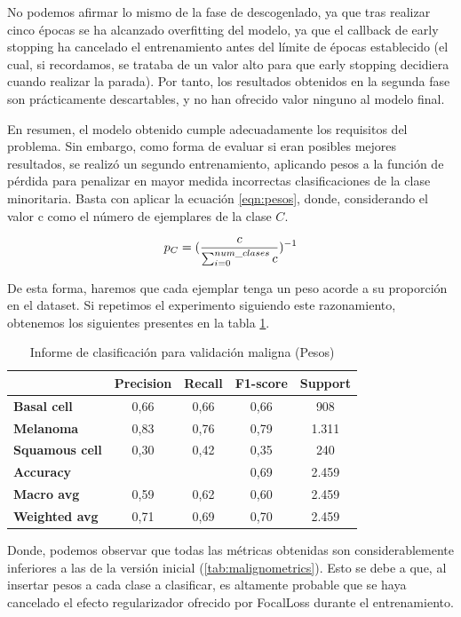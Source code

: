 No podemos afirmar lo mismo de la fase de descogenlado, ya que tras realizar cinco épocas se ha alcanzado overfitting del modelo, ya que el callback de early stopping ha cancelado el entrenamiento antes del límite de épocas establecido (el cual, si recordamos, se trataba de un valor alto para que early stopping decidiera cuando realizar la parada). Por tanto, los resultados obtenidos en la segunda fase son prácticamente descartables, y no han ofrecido valor ninguno al modelo final.

En resumen, el modelo obtenido cumple adecuadamente los requisitos del problema. Sin embargo, como forma de evaluar si eran posibles mejores resultados, se realizó un segundo entrenamiento, aplicando pesos a la función de pérdida para penalizar en mayor medida incorrectas clasificaciones de la clase minoritaria. Basta con aplicar la ecuación \ref{eqn:pesos}, donde, considerando el valor c como el número de ejemplares de la clase $C$.

\begin{equation}
	\label{eqn:pesos}
	\centering
	p_C =(\frac{c}{\sum_{i=0}^{num\_clases} c} )^{-1}
\end{equation}


De esta forma, haremos que cada ejemplar tenga un peso acorde a su proporción en el dataset. Si repetimos el experimento siguiendo este razonamiento, obtenemos los siguientes presentes en la tabla \ref{tab:malignometrics2}.

\begin{table}[!ht]
	\centering
	\begin{tabular}{|l|c|c|c|c|}
		\hline
		& \textbf{Precision} & \textbf{Recall} & \textbf{F1-score} & \textbf{Support} \\
		\hline
		\textbf{Basal cell} & 0,66 & 0,66 & 0,66 & 908 \\
		\textbf{Melanoma} & 0,83 & 0,76 & 0,79 & 1.311 \\
	\textbf{	Squamous cell} & 0,30 & 0,42 & 0,35 & 240 \\
		\hline
		\textbf{Accuracy} &  &  & 0,69 & 2.459 \\ \hline
		\textbf{Macro avg} & 0,59& 0,62& 0,60&2.459\\
		\textbf{Weighted avg}&0,71&0,69&0,70&2.459\\
		\hline
	\end{tabular}
	\caption{Informe de clasificación para validación maligna (Pesos)}
	\label{tab:malignometrics2}
\end{table}


Donde, podemos observar que todas las métricas obtenidas son considerablemente inferiores a las de la versión inicial (\ref{tab:malignometrics}). Esto se debe a que, al insertar pesos a cada clase a clasificar, es altamente probable que se haya cancelado el efecto regularizador ofrecido por FocalLoss durante el entrenamiento.

